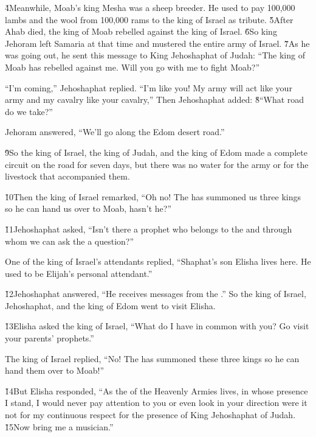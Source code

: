 \v{4}Meanwhile, Moab's king Mesha was a sheep breeder. He used to pay 100,000 lambs and the wool from 100,000 rams to the king of Israel as tribute. \v{5}After Ahab died, the king of Moab rebelled against the king of Israel. \v{6}So king Jehoram left Samaria at that time and mustered the entire army of Israel. \v{7}As he was going out, he sent this message to King Jehoshaphat of Judah: ``The king of Moab has rebelled against me. Will you go with me to fight Moab?''

``I'm coming,'' Jehoshaphat replied. ``I'm like you! My army will act like your army and my cavalry like your cavalry,'' Then Jehoshaphat added: \v{8}``What road do we take?''

Jehoram answered, ``We'll go along the Edom desert road.''

\v{9}So the king of Israel, the king of Judah, and the king of Edom made a complete circuit on the road for seven days, but there was no water for the army or for the livestock that accompanied them.

\v{10}Then the king of Israel remarked, ``Oh no! The  has summoned us three kings so he can hand us over to Moab, hasn't he?''

\v{11}Jehoshaphat asked, ``Isn't there a prophet who belongs to the  and through whom we can ask the  a question?''

One of the king of Israel's attendants replied, ``Shaphat's son Elisha lives here. He used to be Elijah's personal attendant.''

\v{12}Jehoshaphat answered, ``He receives messages from the .'' So the king of Israel, Jehoshaphat, and the king of Edom went to visit Elisha.

\v{13}Elisha asked the king of Israel, ``What do I have in common with you? Go visit your parents' prophets.''

The king of Israel replied, ``No! The  has summoned these three kings so he can hand them over to Moab!''

\v{14}But Elisha responded, ``As the  of the Heavenly Armies lives, in whose presence I stand, I would never pay attention to you or even look in your direction were it not for my continuous respect for the presence of King Jehoshaphat of Judah. \v{15}Now bring me a musician.''


